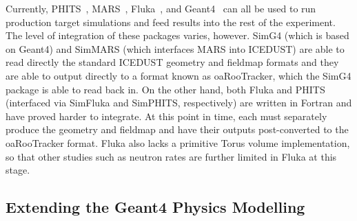 Currently, PHITS~\cite{PHITS2002}, MARS~\cite{MARS1995}, Fluka~\cite{FLUKA2005}, and Geant4~\cite{Geant42003} can all be used to run production target simulations and feed results into the rest of the experiment.
The level of integration of these packages varies, however.
SimG4 (which is based on Geant4) and SimMARS (which interfaces MARS into ICEDUST) are able to read directly the standard ICEDUST geometry and fieldmap formats and they are able to output directly to a format known as oaRooTracker, which the SimG4 package is able to read back in.
On the other hand, both Fluka and PHITS (interfaced via SimFluka and SimPHITS, respectively)  are written in Fortran and have proved harder to integrate. 
At this point in time, each must separately produce the geometry and fieldmap and have their outputs post-converted to the oaRooTracker format.  
Fluka also lacks a primitive Torus volume implementation, so that other studies such as neutron rates are further limited in Fluka at this stage.

\subsection{Extending the Geant4 Physics Modelling}

